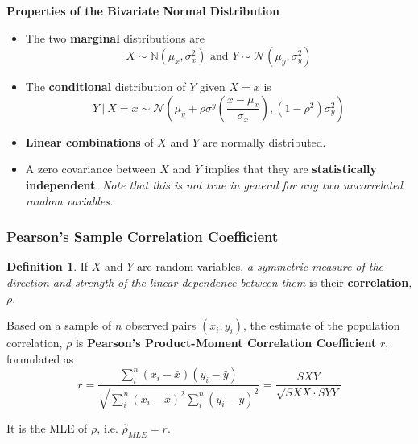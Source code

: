 \documentclass[11pt]{article}
\theoremstyle{definition}
\newtheorem{definition}{Definition}[section]
\numberwithin{equation}{section}
\begin{document}
\textbf{Properties of the Bivariate Normal Distribution}
\begin{itemize}
  \item The two \textbf{marginal} distributions are
  \begin{equation}
    X\sim\mathbb{N}(\mu_x,\sigma_x^2)\text{ and }Y\sim\mathcal{N}(\mu_y,\sigma_y^2)
  \end{equation}
  \item The \textbf{conditional} distribution of $Y$ given $X = x$ is
  \begin{equation}
    Y\>|\>X = x\sim\mathcal{N}\left( \mu_y + \rho\sigma^y\left(\frac{x - \mu_x}{\sigma_x}\right), (1-\rho^2)\sigma_y^2 \right)
  \end{equation}
  \item \textbf{Linear combinations} of $X$ and $Y$ are normally distributed.
  \item A zero covariance between $X$ and $Y$ implies that they are \textbf{statistically independent}. \textit{Note that this is not true in general for any two uncorrelated random variables.}
\end{itemize}

\subsubsection{Pearson's Sample Correlation Coefficient}
\begin{definition}
  If $X$ and $Y$ are random variables, \textit{a symmetric measure of the direction and strength of the linear dependence between them} is their \textbf{correlation}, $\rho$.

  Based on a sample of $n$ observed pairs $(x_i,y_i)$, the estimate of the population correlation, $\rho$ is \textbf{Pearson's Product-Moment Correlation Coefficient} $r$, formulated as
  \begin{equation}\label{XYcorrelation}
    r = \frac{\sum^n_{i}(x_i - \bar{x})(y_i - \bar{y})}{\sqrt{\sum^n_i(x_i - \bar{x})^2\sum^n_i(y_i - \bar{y})^2}}=\frac{SXY}{\sqrt{SXX\cdot SYY}}
  \end{equation}
\end{definition}
\begin{writenotes}
  It is the MLE of $\rho$, i.e. $\hat{\rho}_{MLE}=r$.
\end{writenotes}
\end{document}
